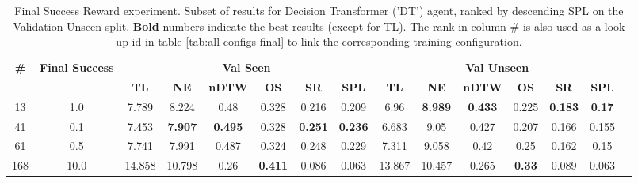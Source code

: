 \begin{table}
\centering
\caption{\label{tab:dt_reward_scale}Final Success Reward experiment. Subset of results for Decision Transformer ('DT') agent, ranked by descending SPL on the Validation Unseen split. \textbf{Bold} numbers indicate the best results (except for TL). The rank in column \# is also used as a look up id in table \ref{tab:all-configs-final} to link the corresponding training configuration.}
\begin{tabular}{@{\hskip3pt}c@{\hskip3pt}c@{\hskip3pt}c@{\hskip3pt}c@{\hskip3pt}c@{\hskip3pt}c@{\hskip3pt}c@{\hskip3pt}c@{\hskip3pt}c@{\hskip3pt}c@{\hskip3pt}c@{\hskip3pt}c@{\hskip3pt}c@{\hskip3pt}c@{\hskip3pt}c}
\toprule
                                  \textbf{\#} & \textbf{Final Success} & \multicolumn{6}{c}{\textbf{Val Seen}} & \multicolumn{6}{c}{\textbf{Val Unseen}} \\
\cmidrule(l){3-8}\cmidrule(l){9-14}\textbf{~} &             \textbf{~} &       \textbf{TL} &     \textbf{NE} &   \textbf{nDTW} &     \textbf{OS} &     \textbf{SR} &    \textbf{SPL} &         \textbf{TL} &     \textbf{NE} &   \textbf{nDTW} &    \textbf{OS} &     \textbf{SR} &   \textbf{SPL} \\
\midrule
                                           13 &                    1.0 &             7.789 &           8.224 &            0.48 &           0.328 &           0.216 &           0.209 &                6.96 &  \textbf{8.989} &  \textbf{0.433} &          0.225 &  \textbf{0.183} &  \textbf{0.17} \\
                                           41 &                    0.1 &             7.453 &  \textbf{7.907} &  \textbf{0.495} &           0.328 &  \textbf{0.251} &  \textbf{0.236} &               6.683 &            9.05 &           0.427 &          0.207 &           0.166 &          0.155 \\
                                           61 &                    0.5 &             7.741 &           7.991 &           0.487 &           0.324 &           0.248 &           0.229 &               7.311 &           9.058 &            0.42 &           0.25 &           0.162 &           0.15 \\
                                          168 &                   10.0 &            14.858 &          10.798 &            0.26 &  \textbf{0.411} &           0.086 &           0.063 &              13.867 &          10.457 &           0.265 &  \textbf{0.33} &           0.089 &          0.063 \\
\bottomrule
\end{tabular}
\end{table}
